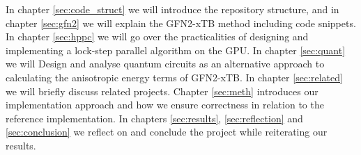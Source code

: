 In chapter \ref{sec:code_struct} we will introduce the repository structure, and in chapter \ref{sec:gfn2} we will explain the GFN2-xTB method including code snippets. In chapter \ref{sec:hppc} we will go over the practicalities of designing and implementing a lock-step parallel algorithm on the GPU. In chapter \ref{sec:quant} we will Design and analyse quantum circuits as an alternative approach to calculating the anisotropic energy terms of GFN2-xTB. In chapter \ref{sec:related} we will briefly discuss related projects. Chapter \ref{sec:meth} introduces our implementation approach and how we ensure correctness in relation to the reference implementation. In chapters \ref{sec:results}, \ref{sec:reflection} and \ref{sec:conclusion} we reflect on and conclude the project while reiterating our results.
